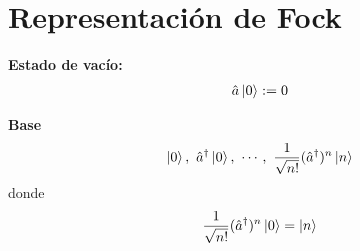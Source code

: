\documentclass{article}
\begin{document}
\section{Representación de Fock} 

\hfill 

\textbf{Estado de vacío:} 
\begin{gather*}
  \hat a \ket{0 } := 0 
\end{gather*}

\textbf{Base } 
\begin{gather*}
  \ket{0 },\ \hat a ^ {\dagger } \ket{0 } , \ \cdots,\  \frac{1}{\sqrt{n! } }(\hat a ^ {\dagger })^n \ket{n }
\end{gather*}
donde 
\begin{gather*}
  \frac{1}{\sqrt{n! } }(\hat a ^ {\dagger })^n \ket{0 } = \ket{n } 
\end{gather*}
\end{document}
